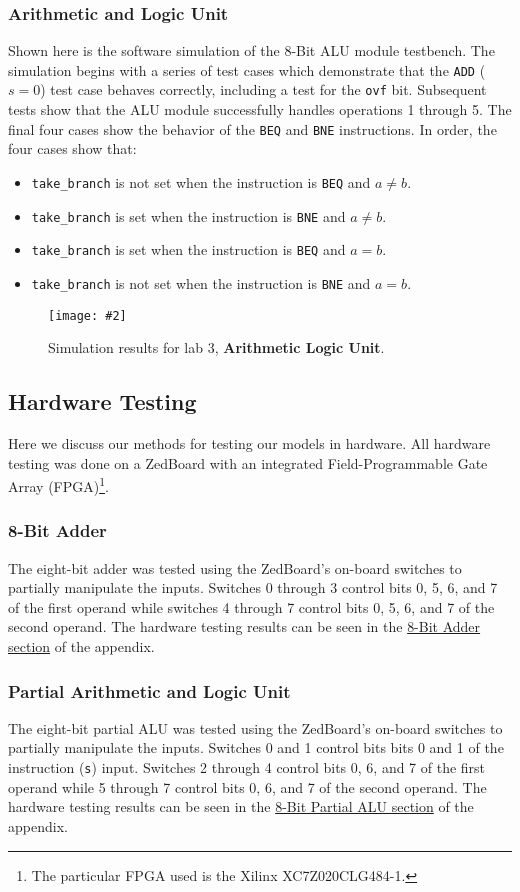 \documentclass[12pt, letterpaper]{article}
\newcommand{\InsertImage}[3][\linewidth]{
	\begin{figure}[h]
		\centering
		\texttt{[image: \#2]}
		\caption{#3}
	\end{figure}
}
\newcommand{\InsertImageHere}[3][\linewidth]{
	\FloatBarrier
	\InsertImage[#1]{#2}{#3}
	\FloatBarrier
}
\begin{document}
\subsubsection{Arithmetic and Logic Unit}
Shown here is the software simulation of the 8-Bit ALU module testbench.  The simulation begins with a series of test cases which demonstrate that the \texttt{ADD} ($s = 0$) test case behaves correctly, including a test for the \texttt{ovf} bit.  Subsequent tests show that the ALU module successfully handles operations 1 through 5.  The final four cases show the behavior of the \texttt{BEQ} and \texttt{BNE} instructions.  In order, the four cases show that:
\begin{itemize}
\item \texttt{take\_branch} is not set when the instruction is \texttt{BEQ} and $a \neq b$.
\item \texttt{take\_branch} is set when the instruction is \texttt{BNE} and $a \neq b$.
\item \texttt{take\_branch} is set when the instruction is \texttt{BEQ} and $a =  b$.
\item \texttt{take\_branch} is not set when the instruction is \texttt{BNE} and $a = b$.
\end{itemize}


\InsertImageHere{images/simulations/lab3/simulation.png}{Simulation results for lab 3, \textbf{Arithmetic Logic Unit}.}


\subsection{Hardware Testing}
Here we discuss our methods for testing our models in hardware. All hardware testing was done on a ZedBoard with an integrated Field-Programmable Gate Array (FPGA)\footnote{The particular FPGA used is the Xilinx XC7Z020CLG484-1.}.  

\subsubsection{8-Bit Adder}
The eight-bit adder was tested using the ZedBoard's on-board switches to partially manipulate the inputs.  Switches 0 through 3 control bits 0, 5, 6, and 7 of the first operand while switches 4 through 7 control bits 0, 5, 6, and 7 of the second operand.  The hardware testing results can be seen in the \hyperref[lab1_hardware]{8-Bit Adder section} of the appendix.

\subsubsection{Partial Arithmetic and Logic Unit}
The eight-bit partial ALU was tested using the ZedBoard's on-board switches to partially manipulate the inputs.  Switches 0 and 1 control bits bits 0 and 1 of the instruction (\texttt{s}) input.  Switches 2 through 4 control bits 0, 6, and 7 of the first operand while 5 through 7 control bits 0, 6, and 7 of the second operand.  The hardware testing results can be seen in the \hyperref[lab2_hardware]{8-Bit Partial ALU section} of the appendix.
\end{document}
